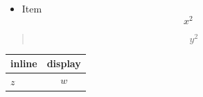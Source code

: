 \begin{frame}[t]
\begin{itemize}
\item Item
\[
x^2
\]
\end{itemize}

\begin{quote}
\[
y^2
\]
\end{quote}

\par\addvspace{\medskipamount}
\noindent\begin{tabularx}{\linewidth}{@{}>{\raggedright\arraybackslash}X>{\raggedright\arraybackslash}X@{}}
\toprule
inline & display \\
\midrule
$z$ & $$w$$ \\
\bottomrule
\end{tabularx}
\par\addvspace{\medskipamount}
\end{frame}

